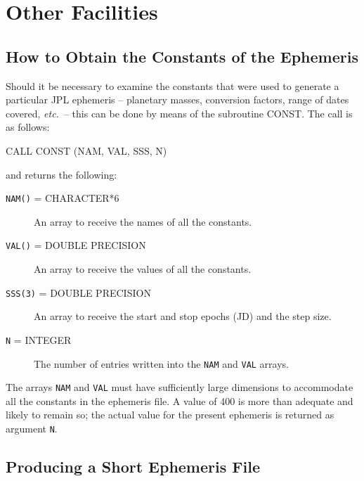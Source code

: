 \documentclass[twoside,11pt,nolof]{starlink}
\begin{document}
\section{Other Facilities}
\label{other_facilities}

\subsection{How to Obtain the Constants of the Ephemeris}
\label{how_to_obtain_the_constants_of_the_ephemeris}

Should it be necessary to examine the constants that were used to generate
a particular JPL ephemeris -- planetary masses, conversion factors,
range of dates covered, \emph{etc.}\ -- this can be done by means of
the subroutine CONST.  The call is as follows:

\begin{terminalv}
CALL CONST (NAM, VAL, SSS, N)
\end{terminalv}

and returns the following:

\begin{description}
\item[\texttt{NAM()} = CHARACTER*6]\mbox{}

An array to receive the names of all the constants.

\item[\texttt{VAL()} = DOUBLE PRECISION]\mbox{}

An array to receive the values of all the constants.

\item[\texttt{SSS(3)} = DOUBLE PRECISION]\mbox{}

An array to receive the start and stop epochs (JD) and the step size.

\item[\texttt{N} = INTEGER]\mbox{}

The number of entries written into the \texttt{NAM} and \texttt{VAL} arrays.

\end{description}

The arrays \texttt{NAM} and \texttt{VAL} must have sufficiently large
dimensions to accommodate all the constants in the ephemeris file.
A value of 400 is more than adequate and likely to remain so;  the actual
value for the present ephemeris is returned as argument \texttt{N}.

\subsection{Producing a Short Ephemeris File}
\label{producing_a_short_ephemeris_file}
\end{document}
